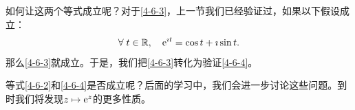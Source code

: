 \documentclass[12pt,UTF8,fontset=none]{ctexbook}
\begin{document}
\begin{so}
    如何让这两个等式成立呢？对于\eqref{4-6-3}，上一节我们已经验证过，如果以下假设成立：
    \begin{equation}
        \forall \; t\in\mathbb{R}, \quad \mathrm{e}^{\imath t} = \cos{t} + \imath \sin{t}. \label{4-6-4}
    \end{equation}
    那么\eqref{4-6-3}就成立。于是，我们把\eqref{4-6-3}转化为验证\eqref{4-6-4}。


    等式\eqref{4-6-2}和\eqref{4-6-4}是否成立呢？后面的学习中，我们会进一步讨论这些问题。到时我们将发现$z \mapsto \mathrm{e}^z$的更多性质。
\end{so}
\end{document}
